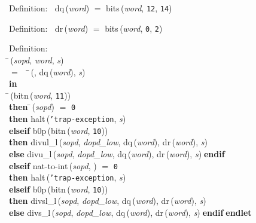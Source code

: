 \begin{tabbing}{\sc Definition}:$\;\;$
{\rm{dq}}\,({\it{word\/}}) $=$ {\rm{bits}}\,({\it{word\/}}, {\tt{12}}, {\tt{14}})
\end{tabbing}

\begin{tabbing}{\sc Definition}:$\;\;$
{\rm{dr}}\,({\it{word\/}}) $=$ {\rm{bits}}\,({\it{word\/}}, {\tt{0}}, {\tt{2}})
\end{tabbing}

\begin{tabbing}{\sc Definition}: \\  
\=\,({\it{sopd\/}}, {\it{word\/}}, {\it{s\/}}) \\ 
$=$$\;\;\;\;$\=\=\,({}, {\rm{dq}}\,({\it{word\/}}), {\it{s\/}})\- \\ 
{\bf in} \\ 
\=\,({\rm{bitn}}\,({\it{word\/}}, {\tt{11}})) \\ 
{\bf then }\=\,({\it{sopd\/}}) $=$ {\tt{0}} \\ 
{\bf then }{\rm{halt}}\,({\tt{'}}{\tt{trap-exception}}, {\it{s\/}}) \\ 
{\bf elseif }{\rm{b0p}}\,({\rm{bitn}}\,({\it{word\/}}, {\tt{10}})) \\ 
{\bf then }{\rm{divul\_l}}\,({\it{sopd\/}}, {\it{dopd\_low\/}}, {\rm{dq}}\,({\it{word\/}}), {\rm{dr}}\,({\it{word\/}}), {\it{s\/}}) \\ 
{\bf else }{\rm{divu\_l}}\,({\it{sopd\/}}, {\it{dopd\_low\/}}, {\rm{dq}}\,({\it{word\/}}), {\rm{dr}}\,({\it{word\/}}), {\it{s\/}})$\;${\bf  endif}\- \\ 
{\bf elseif }{\rm{nat-to-int}}\,({\it{sopd\/}}, {}) $=$ {\tt{0}} \\ 
{\bf then }{\rm{halt}}\,({\tt{'}}{\tt{trap-exception}}, {\it{s\/}}) \\ 
{\bf elseif }{\rm{b0p}}\,({\rm{bitn}}\,({\it{word\/}}, {\tt{10}})) \\ 
{\bf then }{\rm{divsl\_l}}\,({\it{sopd\/}}, {\it{dopd\_low\/}}, {\rm{dq}}\,({\it{word\/}}), {\rm{dr}}\,({\it{word\/}}), {\it{s\/}}) \\ 
{\bf else }{\rm{divs\_l}}\,({\it{sopd\/}}, {\it{dopd\_low\/}}, {\rm{dq}}\,({\it{word\/}}), {\rm{dr}}\,({\it{word\/}}), {\it{s\/}})$\;${\bf  endif}\-$\;${\bf  endlet}\-\-
\end{tabbing}
     
